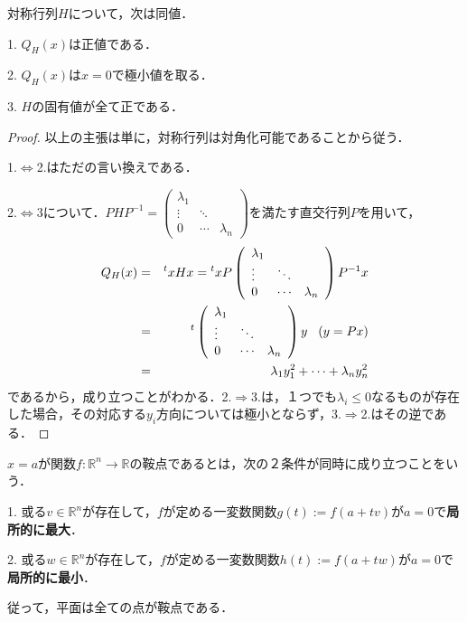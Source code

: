 \documentclass[uplatex, dvipdfmx]{jsreport}
\begin{document}
\begin{shadebox}\begin{proposition}[正定値な対称行列の理論]\label{prop-symmetric-matrix}
    対称行列$H$について，次は同値．

    1. $Q_H(x)$は正値である．

    2. $Q_H(x)$は$x=0$で極小値を取る．

    3. $H$の固有値が全て正である．
\end{proposition}\end{shadebox}
\begin{proof}
    以上の主張は単に，対称行列は対角化可能であることから従う．

    1.$\Leftrightarrow$2.はただの言い換えである．

    2.$\Leftrightarrow$3について．$PHP^{-1}=\left(\begin{array}{lcr}\lambda_1 & & \\ \vdots & \ddots & \\ 0 & \cdots & \lambda_n\end{array}\right)$を満たす直交行列$P$を用いて，
    \begin{eqnarray*}
        Q_H(x)&=&{}^txHx={}^txP\left(\begin{array}{lcr}\lambda_1 & & \\ \vdots & \ddots & \\ 0 & \cdots & \lambda_n\end{array}\right)P^{-1}x \\
            &=& {}^t\left(\begin{array}{lcr}\lambda_1 & & \\ \vdots & \ddots & \\ 0 & \cdots & \lambda_n\end{array}\right)y \hspace{3mm}(y=Px)\\
            &=& \lambda_1y_1^2 +\cdots +\lambda_ny_n^2
    \end{eqnarray*}
    であるから，成り立つことがわかる．2.$\Rightarrow$3.は，１つでも$\lambda_i\le 0$なるものが存在した場合，その対応する$y_i$方向については極小とならず，3.$\Rightarrow$2.はその逆である．
\end{proof}

\begin{definition}
    $x=a$が関数$f:\mathbb{R}^n\to\mathbb{R}$の鞍点であるとは，次の２条件が同時に成り立つことをいう．

    1. 或る$v\in\mathbb{R}^n$が存在して，$f$が定める一変数関数$g(t):=f(a+tv)$が$a=0$で\textbf{局所的に最大}．

    2. 或る$w\in\mathbb{R}^n$が存在して，$f$が定める一変数関数$h(t):=f(a+tw)$が$a=0$で\textbf{局所的に最小}．
\end{definition}
\begin{remark}
    従って，平面は全ての点が鞍点である．
\end{remark}
\end{document}
